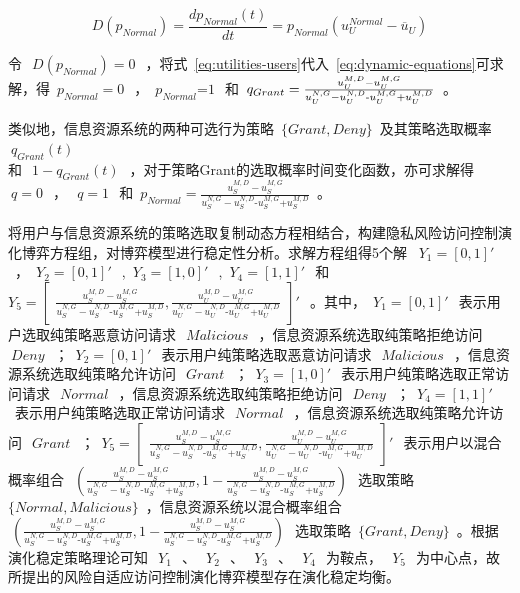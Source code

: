 \begin{equation}\label{eq:dynamic-equations}
D({{p}_{Normal}})=\frac{d{{p}_{Normal}}(t)}{dt}={{p}_{Normal}}(u_{U}^{Normal}-{{\overline{u}}_{U}})
\end{equation}

 令~$~D({{p}_{Normal}})=0~$~，将式~\ref{eq:utilities-users}代入~\ref{eq:dynamic-equations}可求解，得~${{p}_{Normal}}=0~$~，~${{p}_{Normal}}\text{=}1~$~和~${{q}_{Grant}}=\\\frac{u_{U}^{M,D}-u_{U}^{M,G}}{u_{U}^{N,G}-u_{U}^{N,D}\text{-}u_{U}^{M,G}\text{+}u_{U}^{M,D}}$~。
 
 类似地，信息资源系统的两种可选行为策略~$\{Grant,Deny\}$~及其策略选取概率~$~q_{Grant}(t)~$\\和~$~1-q_{Grant}(t)~$~，对于策略Grant的选取概率时间变化函数，亦可求解得~$~q=0~$~，~$~q=1~$~和~${{p}_{Normal}}=\frac{u_{S}^{M,D}-u_{S}^{M,G}}{u_{S}^{N,G}-u_{S}^{N,D}\text{-}u_{S}^{M,G}\text{+}u_{S}^{M,D}}$~。

将用户与信息资源系统的策略选取复制动态方程相结合，构建隐私风险访问控制演化博弈方程组，对博弈模型进行稳定性分析。求解方程组得5个解 ~${{Y}_{1}}=[0,1]'~$~，~${{Y}_{2}}=\left[ 0 ,1 \right]'~$~,~${{Y}_{3}}=\left[1 ,0 \right]'~$~,~${{Y}_{4}}=\left[ 1 ,1 \right]'~$~和~${{Y}_{5}}=
\begin{bmatrix}
\frac{u_{S}^{M,D}-u_{S}^{M,G}}{u_{S}^{N,G}-u_{S}^{N,D}\text{-}u_{S}^{M,G}\text{+}u_{S}^{M,D}},
\frac{u_{U}^{M,D}-u_{U}^{M,G}}{u_{U}^{N,G}-u_{U}^{N,D}\text{-}u_{U}^{M,G}\text{+}u_{U}^{M,D}}
\end{bmatrix}'~$~。其中，~${{Y}_{1}}=[0,1]'~$~表示用户选取纯策略恶意访问请求~$~Malicious~$~，信息资源系统选取纯策略拒绝访问~$~Deny~$~；~${{Y}_{2}}=\left[ 0 ,1 \right]'~$~表示用户纯策略选取恶意访问请求~$~Malicious~$~，信息资源系统选取纯策略允许访问~$~Grant~$~；~${{Y}_{3}}=\left[1 ,0 \right]'~$~表示用户纯策略选取正常访问请求~$~Normal~$~，信息资源系统选取纯策略拒绝访问~$~Deny~$~；~${{Y}_{4}}=\left[ 1 ,1 \right]'~$~表示用户纯策略选取正常访问请求~$~Normal~$~，信息资源系统选取纯策略允许访问~$~Grant~$~；~${{Y}_{5}}=
\begin{bmatrix}
\frac{u_{S}^{M,D}-u_{S}^{M,G}}{u_{S}^{N,G}-u_{S}^{N,D}\text{-}u_{S}^{M,G}\text{+}u_{S}^{M,D}},
\frac{u_{U}^{M,D}-u_{U}^{M,G}}{u_{U}^{N,G}-u_{U}^{N,D}\text{-}u_{U}^{M,G}\text{+}u_{U}^{M,D}}
\end{bmatrix}'~$~表示用户以混合概率组合~$~( \frac{u_{S}^{M,D}-u_{S}^{M,G}}{u_{S}^{N,G}-u_{S}^{N,D}\text{-}u_{S}^{M,G}\text{+}u_{S}^{M,D}}, 1- \frac{u_{S}^{M,D}-u_{S}^{M,G}}{u_{S}^{N,G}-u_{S}^{N,D}\text{-}u_{S}^{M,G}\text{+}u_{S}^{M,D}})~$~选取策略~$\{Normal, Malicious\}$~，信息资源系统以混合概率组合~$~(\frac{u_{S}^{M,D}-u_{S}^{M,G}}{u_{S}^{N,G}-u_{S}^{N,D}\text{-}u_{S}^{M,G}\text{+}u_{S}^{M,D}} , 1-\frac{u_{S}^{M,D}-u_{S}^{M,G}}{u_{S}^{N,G}-u_{S}^{N,D}\text{-}u_{S}^{M,G}\text{+}u_{S}^{M,D}} )~$~选取策略~$\{Grant, Deny\}$~。根据演化稳定策略理论可知~$~Y_1~$~、~$~Y_2~$~、~$~Y_3~$~、~$~Y_4~$~为鞍点，~$~Y_5~$~为中心点，故所提出的风险自适应访问控制演化博弈模型存在演化稳定均衡。

